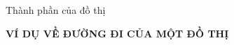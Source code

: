 
\begin{frame}{Thành phần của đồ thị}

\begin{center} 
\textbf{VÍ DỤ VỀ ĐƯỜNG ĐI CỦA MỘT ĐỒ THỊ}
\end{center}

\end{frame}

